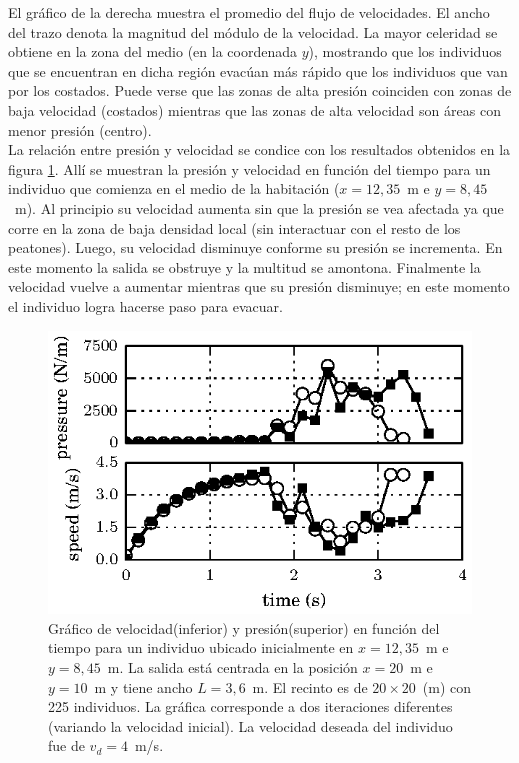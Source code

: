 El gráfico de la derecha muestra el promedio del flujo de velocidades. El ancho del trazo denota la magnitud del módulo de la velocidad. La mayor celeridad se obtiene en la zona del medio (en la coordenada $y$), mostrando que los individuos que se encuentran en dicha región evacúan más rápido que los individuos que van por los costados. 
Puede verse que las zonas de alta presión coinciden con zonas de baja velocidad (costados) mientras que las zonas de alta velocidad son áreas con menor presión (centro). \\

La relación entre presión y velocidad se condice con los resultados obtenidos en la figura \ref{pa_vel_t_100_3_6}. Allí se muestran la presión y velocidad en función del tiempo para un individuo que comienza en el medio de la habitación ($x=12,35$~m e $y=8,45$~m). Al principio su velocidad aumenta sin que la presión se vea afectada ya que corre en la zona de baja densidad local (sin interactuar con el resto de los peatones). Luego, su velocidad disminuye conforme su presión se incrementa. En este momento la salida se obstruye y la multitud se amontona. Finalmente la velocidad vuelve a aumentar mientras que su presión disminuye; en este momento el individuo logra hacerse paso para evacuar. 

\begin{figure}[H]
    \centering
    \includegraphics[scale=1.6]{figuras/p_vel_t_100_3_6.eps}
    \caption[width=5cm]{Gráfico de velocidad(inferior) y presión(superior) en función del tiempo para un individuo ubicado inicialmente en $x=12,35$~m e $y=8,45$~m.  La salida está centrada en la posición $x=20$~m e $y=10$~m y tiene ancho $L=3,6$~m. El recinto es de $20\times 20$~(m) con 225 individuos. La gráfica corresponde a dos iteraciones diferentes (variando la velocidad inicial). La velocidad deseada del individuo fue de $v_d=4$~m/s.}
    \label{pa_vel_t_100_3_6}
\end{figure}


